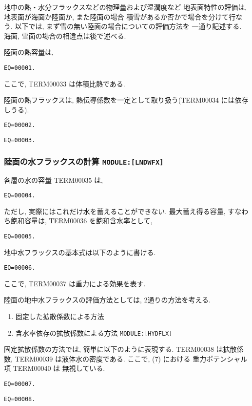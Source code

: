地中の熱・水分フラックスなどの物理量および湿潤度など
地表面特性の評価は, 地表面が海面か陸面か, また陸面の場合
積雪があるか否かで場合を分けて行なう. 
以下では, まず雪の無い陸面の場合についての評価方法を
一通り記述する. 海面, 雪面の場合の相違点は後で述べる. 

陸面の熱容量は,
\begin{verbatim}
EQ=00001.
\end{verbatim}
ここで, TERM00033 は体積比熱である.

陸面の熱フラックスは, 熱伝導係数を一定として取り扱う(TERM00034 には依存しうる).
\begin{verbatim}
EQ=00002.
\end{verbatim}
\begin{verbatim}
EQ=00003.
\end{verbatim}

\subsubsection{陸面の水フラックスの計算 \texttt{MODULE:[LNDWFX]}}

各層の水の容量 TERM00035 は, 
\begin{verbatim}
EQ=00004.
\end{verbatim}
ただし, 実際にはこれだけ水を蓄えることができない.
最大蓄え得る容量, すなわち飽和容量は, TERM00036 を飽和含水率として,
\begin{verbatim}
EQ=00005.
\end{verbatim}

地中水フラックスの基本式は以下のように書ける. 
\begin{verbatim}
EQ=00006.
\end{verbatim}
ここで, TERM00037 は重力による効果を表す. 

陸面の地中水フラックスの評価方法としては, 2通りの方法を考える.
\begin{enumerate}
\item 固定した拡散係数による方法
\item 含水率依存の拡散係数による方法 \texttt{MODULE:[HYDFLX]}
\end{enumerate}

固定拡散係数の方法では, 簡単に以下のように表現する.
TERM00038 は拡散係数, TERM00039 は液体水の密度である.
ここで, (7) における 重力ポテンシャル項 TERM00040 は
無視している. 
\begin{verbatim}
EQ=00007.
\end{verbatim}
\begin{verbatim}
EQ=00008.
\end{verbatim}

